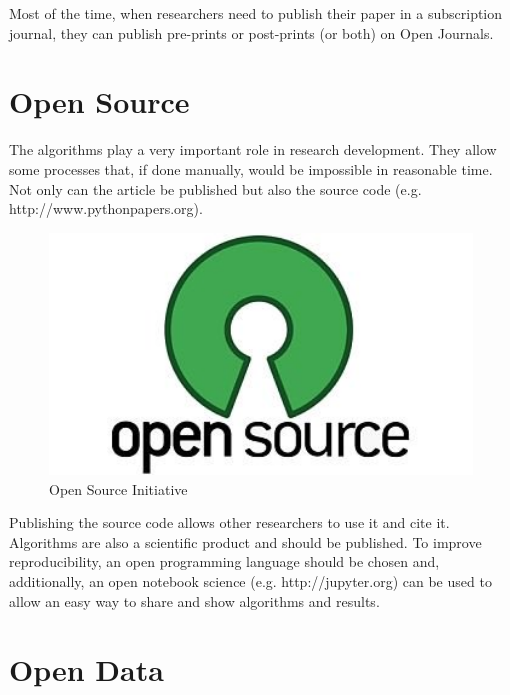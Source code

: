 \documentclass[a0,portrait]{a0poster}
\begin{document}
\begin{multicols}{2}
Most of the time, when researchers need to publish their paper in a subscription journal, they can publish pre-prints or post-prints (or both) on Open Journals.


\section*{Open Source}

The algorithms play a very important role in research development. They allow some processes that, if done manually, would be impossible in reasonable time. Not only can the article be published but also the source code (e.g. http://www.pythonpapers.org). \\

\begin{figure}
    \includegraphics[width=500px]{opensource.png}
    \caption{Open Source Initiative}
\end{figure}

Publishing the source code allows other researchers to use it and cite it. Algorithms are also a scientific product and should be published. To improve reproducibility, an open programming language should be chosen and, additionally, an open notebook science (e.g. http://jupyter.org) can be used to allow an easy way to share and show algorithms and results.

\section*{Open Data}


\end{multicols}
\end{document}
